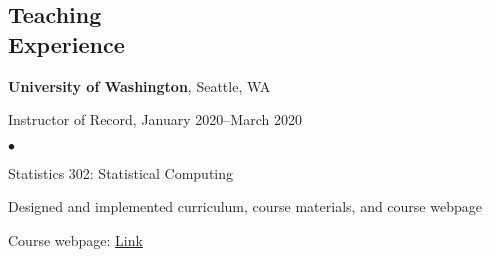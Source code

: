 \documentclass[margin,centered]{res}
\newenvironment{list1}{
  \begin{list}{\ding{113}}{%
      \setlength{\itemsep}{0in}
      \setlength{\parsep}{0in} \setlength{\parskip}{0in}
      \setlength{\topsep}{0in} \setlength{\partopsep}{0in}
      \setlength{\leftmargin}{0.17in}}}{\end{list}}
\newenvironment{list2}{
  \begin{list}{$\bullet$}{%
      \setlength{\itemsep}{0in}
      \setlength{\parsep}{0in} \setlength{\parskip}{0in}
      \setlength{\topsep}{0in} \setlength{\partopsep}{0in}
      \setlength{\leftmargin}{0.2in}}}{\end{list}}
\begin{document}
\begin{resume}
\begin{comment}
{\bf Center for Khmer Studies}, Siem Reap, Cambodia
\begin{list1}
\item[] 
Undergraduate Research Fellow, June 2013--August 2013
\begin{list2}
\vspace*{.05in}
\item Conducted a statistical analysis of price discrimination in the bargain economy of Cambodian markets
\item Took coursework in applied social science research methodology
\item Designed an experiment to test the effects of gender and ethnicity on offered prices
\item Presented results at the Center for Khmer Studies research symposium
\end{list2} 
\end{list1}

{\bf MN2020}, St. Paul, Minnesota
\begin{list1}
\item[] 
Education Research Fellow, January 2013--February 2013
\begin{list2}
\vspace*{.05in}
\item Analyzed local, state, and national education policy through the lens of racial and socioeconomic equity
\item Composed reports evaluating current policy and advocating for policy change
\item Published policy reports to various social media outlets with over 47,000 subscribers
\item Gathered and cleaned data for project to evaluate charter school funding and outcomes
\end{list2}
\end{list1}
\end{comment}

\section{\sc Teaching \\ Experience}
{\bf University of Washington}, Seattle, WA
\begin{list1}
\item[] Instructor of Record, January 2020--March 2020
\begin{list2}
\vspace*{.05in}
\item Statistics 302: Statistical Computing
\item Designed and implemented curriculum, course materials, and course webpage
\item Course webpage: \href{https://bryandmartin.github.io/STAT302}{Link}
\end{list2}
\end{list1}



\end{resume}
\end{document}
